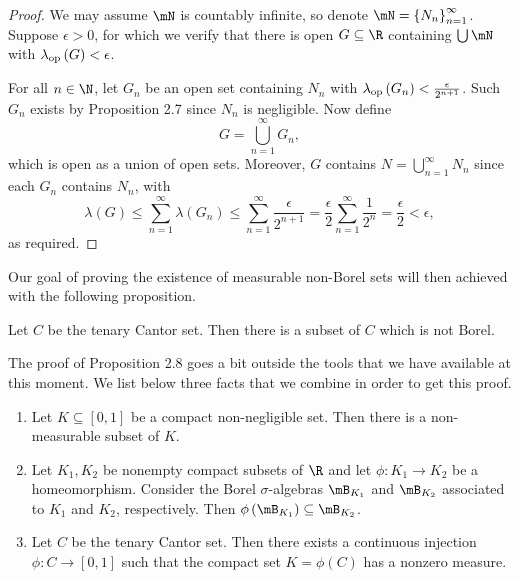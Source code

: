 \documentclass[pmath450]{subfiles}
\begin{document}
    \begin{proof}
        We may assume $\mN$ is countably infinite, so denote $\mN = \left\lbrace N_n \right\rbrace^{\infty}_{n=1}$. Suppose $\epsilon>0$, for which we verify that there is open $G\subseteq\R$ containing $\bigcup\mN$ with $\lambda_{\operatorname{op}}\left( G \right)<\epsilon$.

        For all $n\in\N$, let $G_n$ be an open set containing $N_n$ with $\lambda_{\operatorname{op}}\left( G_n \right) < \frac{\epsilon}{2^{n+1}}$. Such $G_n$ exists by Proposition 2.7 since $N_n$ is negligible. Now define
        \begin{equation*}
            G = \bigcup^{\infty}_{n=1}G_n,
        \end{equation*}
        which is open as a union of open sets. Moreover, $G$ contains $N=\bigcup^{\infty}_{n=1}N_n$ since each $G_n$ contains $N_n$, with
        \begin{equation*}
            \lambda\left( G \right) \leq \sum^{\infty}_{n=1}\lambda\left( G_n \right) \leq \sum^{\infty}_{n=1} \frac{\epsilon}{2^{n+1}} = \frac{\epsilon}{2} \sum^{\infty}_{n=1}\frac{1}{2^n} = \frac{\epsilon}{2}<\epsilon,
        \end{equation*}
        as required.
    \end{proof}

    \np Our goal of proving the existence of measurable non-Borel sets will then achieved with the following proposition.

    \begin{prop}{}
        Let $C$ be the tenary Cantor set. Then there is a subset of $C$ which is not Borel.
    \end{prop}


    \np The proof of Proposition 2.8 goes a bit outside the tools that we have available at this moment. We list below three facts that we combine in order to get this proof.

    \begin{fact}{}
        \vspace{-11pt}
        \begin{enumerate}
            \item Let $K\subseteq\left[ 0,1 \right]$ be a compact non-negligible set. Then there is a non-measurable subset of $K$.
            \item Let $K_1,K_2$ be nonempty compact subsets of $\R$ and let $\phi:K_1\to K_2$ be a homeomorphism. Consider the Borel $\sigma$-algebras $\mB_{K_1}$ and $\mB_{K_2}$ associated to $K_1$ and $K_2$, respectively. Then $\phi\left( \mB_{K_1} \right)\subseteq\mB_{K_2}$.
            \item Let $C$ be the tenary Cantor set. Then there exists a continuous injection $\phi:C\to\left[ 0,1 \right]$ such that the compact set $K=\phi\left( C \right)$ has a nonzero measure.
        \end{enumerate}
    \end{fact}
\end{document}
